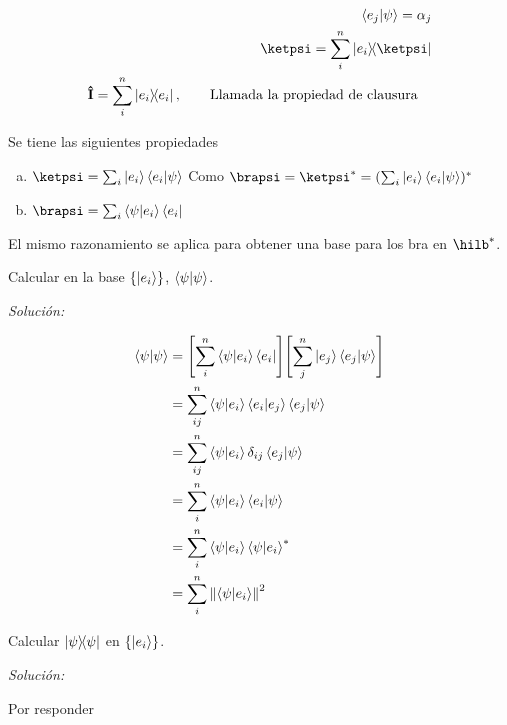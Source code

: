          \begin{align*}
             \braket{e_j}{\psi}=\alpha_j     \\
             \ketpsi=\sum_i^n\op{e_i}\ketpsi \\
             \vu{I}=\sum_i^n\op{e_i}\qc\qq{Llamada la propiedad de clausura}
         \end{align*}

         Se tiene las siguientes propiedades
         \begin{enumerate}[a)]
             \item $\ketpsi=\sum_i \ket{e_i}\braket{e_i}{\psi}$
                   Como $\brapsi=\ketpsi^*=(\sum_i \ket{e_i}\braket{e_i}{\psi})^*$
             \item $\brapsi=\sum_i \braket{\psi}{e_i}\bra{e_i}$
         \end{enumerate}

         El mismo razonamiento se aplica para obtener una base para los bra en $\hilb^*$.

         \begin{example}
             Calcular en la base $\{\ket{e_i}\}$, $\braket{\psi}$.

             \textit{Solución:}

             \begin{align*}
                 \braket{\psi} & =\qty\Bigg[\sum_i^n\braket{\psi}{e_i}\bra{e_i}]\qty\Bigg[\sum_j^n\ket{e_j}\braket{e_j}{\psi}] \\
                               & =\sum_{ij}^n\braket{\psi}{e_i}\bra{e_i}\ket{e_j}\braket{e_j}{\psi}                            \\
                               & =\sum_{ij}^n \braket{\psi}{e_i}\delta_{ij}\braket{e_j}{\psi}                                  \\
                               & =\sum_i^n \braket{\psi}{e_i}\braket{e_i}{\psi}                                                \\
                               & =\sum_i^n \braket{\psi}{e_i}\braket{\psi}{e_i}^*                                              \\
                               & =\sum_i^n \norm{\braket{\psi}{e_i}}^2
             \end{align*}
         \end{example}

         \begin{example}[Deber]
             Calcular $\op{\psi}$ en $\{\ket{e_i}\}$.

             \textit{Solución:}

             Por responder
         \end{example}

